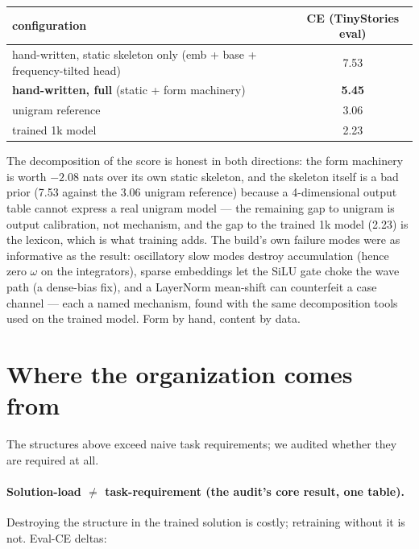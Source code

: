 \documentclass[11pt]{article}
\begin{document}
\begin{center}
\small
\begin{tabular}{lc}
\toprule
configuration & CE (TinyStories eval) \\
\midrule
hand-written, static skeleton only (emb + base + frequency-tilted head) & 7.53 \\
\textbf{hand-written, full} (static + form machinery) & \textbf{5.45} \\
unigram reference & 3.06 \\
trained 1k model & 2.23 \\
\bottomrule
\end{tabular}
\end{center}

The decomposition of the score is honest in both directions: the form
machinery is worth $-2.08$ nats over its own static skeleton, and the
skeleton itself is a bad prior (7.53 against the 3.06 unigram reference)
because a 4-dimensional output table cannot express a real unigram model
--- the remaining gap to unigram is output calibration, not mechanism,
and the gap to the trained 1k model (2.23) is the lexicon, which is what
training adds. The build's own failure modes were as informative as the
result: oscillatory slow modes destroy accumulation (hence zero $\omega$
on the integrators), sparse embeddings let the SiLU gate choke the wave
path (a dense-bias fix), and a LayerNorm mean-shift can counterfeit a
case channel --- each a named mechanism, found with the same decomposition
tools used on the trained model. Form by hand, content by data.

\section{Where the organization comes from}
\label{sec:organization}

The structures above exceed naive task requirements; we audited whether
they are required at all.

\paragraph{Solution-load $\neq$ task-requirement (the audit's core
result, one table).}
Destroying the structure in the trained solution is costly; retraining
without it is not. Eval-CE deltas:
\end{document}
